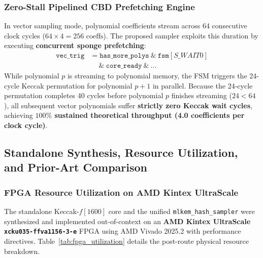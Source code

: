 \subsubsection{Zero-Stall Pipelined CBD Prefetching Engine}
In vector sampling mode, polynomial coefficients stream across 64 consecutive clock cycles ($64 \times 4 = 256\text{ coeffs}$). The proposed sampler exploits this duration by executing \textbf{concurrent sponge prefetching}:
\begin{equation}
\begin{aligned}
\texttt{vec\_trig} &= \texttt{has\_more\_polys} \ \& \ \texttt{fsm}[S\_WAIT0] \\
                   &\quad \ \& \ \texttt{core\_ready} \ \& \ \dots
\end{aligned}
\label{eq:vec_prefetch}
\end{equation}
While polynomial $p$ is streaming to polynomial memory, the FSM triggers the 24-cycle Keccak permutation for polynomial $p+1$ in parallel. Because the 24-cycle permutation completes 40 cycles before polynomial $p$ finishes streaming ($24 < 64$), all subsequent vector polynomials suffer \textbf{strictly zero Keccak wait cycles}, achieving \textbf{$100\%$ sustained theoretical throughput (4.0 coefficients per clock cycle)}.

\subsection{Standalone Synthesis, Resource Utilization, and Prior-Art Comparison}
\label{sec:keccak_results}

\subsubsection{FPGA Resource Utilization on AMD Kintex UltraScale}
The standalone Keccak-$f[1600]$ core and the unified \texttt{mlkem\_hash\_sampler} were synthesized and implemented out-of-context on an \textbf{AMD Kintex UltraScale \texttt{xcku035-ffva1156-3-e}} FPGA using AMD Vivado 2025.2 with performance directives. Table~\ref{tab:fpga_utilization} details the post-route physical resource breakdown.

